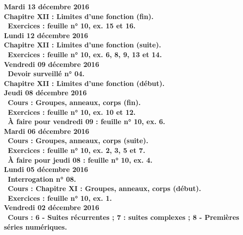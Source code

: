 \documentclass[12pt,a4paper]{article}
\begin{document}
\noindent\textbf{Mardi 13 décembre 2016} \\
\bf Chapitre XII \rm : Limites d'une fonction (fin).\\
\bu\ Exercices : feuille n° 10, ex. 15 et 16.\vspace{.4cm}\\

\noindent\textbf{Lundi 12 décembre 2016} \\
\bf Chapitre XII \rm : Limites d'une fonction (suite).\\
\bu\ Exercices : feuille n° 10, ex. 6, 8, 9, 13 et 14.\vspace{.4cm}\\
  
\noindent\textbf{Vendredi 09 décembre 2016}\\
\bu\ Devoir surveillé n° 04.\\
\bf Chapitre XII \rm : Limites d'une fonction (début).\vspace{.4cm}\\

\noindent\textbf{Jeudi 08 décembre 2016}\\
\bu\ Cours : Groupes, anneaux, corps (fin).\\
\bu\ Exercices : feuille n° 10, ex. 10 et 12.\\
\bu\ À faire pour vendredi 09 : feuille n° 10, ex. 6.\vspace{.4cm}\\

\noindent\textbf{Mardi 06 décembre 2016} \\
\bu\ Cours : Groupes, anneaux, corps (suite).\\
\bu\ Exercices : feuille n° 10, ex. 2, 3, 5 et 7.\\
\bu\ À faire pour jeudi 08 : feuille n° 10, ex. 4.\vspace{.4cm}\\

\noindent\textbf{Lundi 05 décembre 2016} \\
\bu\ Interrogation n° 08.\\
\bu\ Cours : \bf Chapitre XI \rm : Groupes, anneaux, corps (début).\\
\bu\ Exercices : feuille n° 10, ex. 1.\vspace{.4cm}\\
  
\noindent\textbf{Vendredi 02 décembre 2016}\\
\bu\ Cours : 6 - Suites récurrentes ; 7 : suites complexes ; 8 - Premières séries numériques.\vspace{.4cm}\\
  
\end{document}
